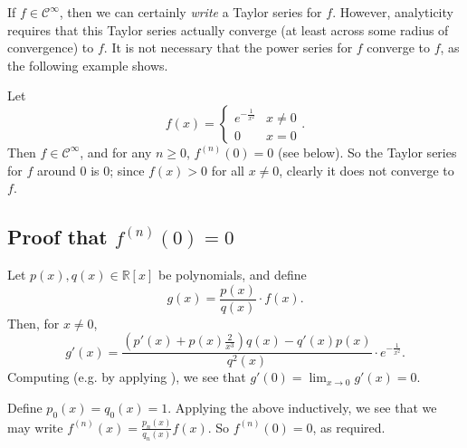 \documentclass[12pt]{article}
\newcommand{\Reals}{\mathbb{R}}
\begin{document}
If $f\in\mathcal{C}^{\infty}$, then we can certainly \emph{write} a Taylor series for $f$.  However, analyticity requires that this Taylor series actually converge (at least across some radius of convergence) to $f$.  It is not necessary that the power series for $f$ converge to $f$, as the following example shows.

\newcommand{\e}{e^{-\frac{1}{x^2}}}
Let
$$
f(x)=\begin{cases}
\e & x \ne 0 \\
0 & x = 0
\end{cases}.
$$
Then $f\in \mathcal{C}^{\infty}$, and for any $n\ge 0$, $f^{(n)}(0)=0$ (see below).  So the Taylor series for $f$ around 0 is 0; since $f(x)>0$ for all $x\ne 0$, clearly it does not converge to $f$.

\subsection*{Proof that $f^{(n)}(0)=0$}

Let $p(x), q(x)\in \Reals[x]$ be polynomials, and define
$$
g(x)=\frac{p(x)}{q(x)} \cdot f(x).
$$
Then, for $x\ne 0$,
$$
g'(x) = \frac{(p'(x) + p(x)\frac{2}{x^3})q(x) - q'(x)p(x)}{q^2(x)} \cdot\e.
$$
Computing (e.g. by applying ), we see that $g'(0)=\lim_{x\to 0}g'(x)=0$.

Define $p_0(x)=q_0(x)=1$.  Applying the above inductively, we see that we may write $f^{(n)}(x)=\frac{p_n(x)}{q_n(x)}f(x)$.  So $f^{(n)}(0)=0$, as required.
\end{document}

